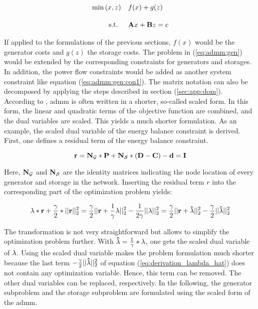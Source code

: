 \begin{subequations}
	\begin{align}
		\min{(x, z)} \quad & f(x) + g(z) \label{eq:admm:gen}\\[10pt]
		\text{s.t. } \quad & \vb{A}x + \vb{B}z = c \label{eq:admm:gen:con1}
	\end{align}
\end{subequations}

If applied to the formulations of the previous sections, $f(x)$ would be the generator costs and $g(z)$ the storage costs. The problem in (\ref{eq:admm:gen}) would be extended by the corresponding constraints for generators and storages. In addition, the power flow constraints would be added as another system constraint like equation (\ref{eq:admm:gen:con1}). The matrix notation can also be decomposed by applying the steps described in section (\ref{sec:app:dom}). \\

According to \citet{boyd2010}, \gls{admm} is often written in a shorter, so-called scaled form. In this form, the linear and quadratic terms of the objective function are combined, and the dual variables are scaled. This yields a much shorter formulation. As an example, the scaled dual variable of the energy balance constraint is derived. First, one defines a residual term of the energy balance constraint.

\begin{equation}
	\vb{r} = \vb{N_\mathcal{G}}*\vb{P} + \vb{N_\mathcal{S}}*(\vb{D} - \vb{C}) - \vb{d} = \vb{I}
\end{equation}

Here, $\vb{N_\mathcal{G}}$ and $\vb{N_\mathcal{S}}$ are the identity matrices indicating the node location of every generator and storage in the network. Inserting the residual term $r$ into the corresponding part of the optimization problem yields:

\begin{equation}
	\vb{\lambda} * \vb{r} + \frac{\gamma}{2} * || \vb{r} ||^2_2 = \frac{\gamma}{2} || \vb{r} + \frac{1}{\gamma}\vb{\lambda} ||^2_2 - \frac{1}{2\gamma}|| \vb{\lambda} ||^2_2 = \frac{\gamma}{2} || \vb{r} + \vb{\hat{\lambda}} ||^2_2 - \frac{\gamma}{2}|| \vb{\hat{\lambda}} ||^2_2 \label{eq:derivation_lambda_hat}
\end{equation}

The transformation is not very straightforward but allows to simplify the optimization problem further. With $\vb{\hat{\lambda}} = \frac{1}{\gamma}*\vb{\lambda}$, one gets the scaled dual variable of $\vb{\lambda}$. Using the scaled dual variable makes the problem formulation much shorter because the last term $- \frac{\gamma}{2}|| \vb{\hat{\lambda}} ||^2_2$ of equation (\ref{eq:derivation_lambda_hat}) does not contain any optimization variable. Hence, this term can be removed. The other dual variables can be replaced, respectively. In the following, the generator subproblem and the storage subproblem are formulated using the scaled form of the \gls{admm}.

